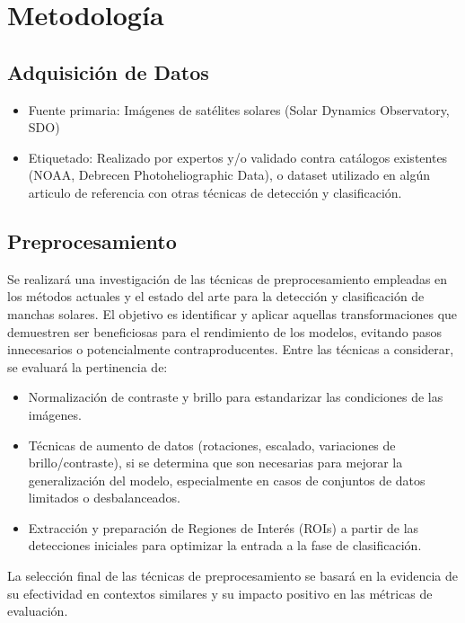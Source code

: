 \documentclass[conference]{IEEEtran}
\begin{document}
\section*{Metodología}

\subsection*{Adquisición de Datos}
\begin{itemize}
    \item Fuente primaria: Imágenes de satélites solares (Solar Dynamics Observatory, SDO)
    \item Etiquetado: Realizado por expertos y/o validado contra catálogos existentes (NOAA, Debrecen Photoheliographic Data), o dataset utilizado en algún articulo de referencia con otras técnicas de detección y clasificación.
\end{itemize}


\subsection*{Preprocesamiento}
Se realizará una investigación de las técnicas de preprocesamiento empleadas en los métodos actuales y el estado del arte para la detección y clasificación de manchas solares. El objetivo es identificar y aplicar aquellas transformaciones que demuestren ser beneficiosas para el rendimiento de los modelos, evitando pasos innecesarios o potencialmente contraproducentes. Entre las técnicas a considerar, se evaluará la pertinencia de:
\begin{itemize}
    \item Normalización de contraste y brillo para estandarizar las condiciones de las imágenes.
    \item Técnicas de aumento de datos (rotaciones, escalado, variaciones de brillo/contraste), si se determina que son necesarias para mejorar la generalización del modelo, especialmente en casos de conjuntos de datos limitados o desbalanceados.
    \item Extracción y preparación de Regiones de Interés (ROIs) a partir de las detecciones iniciales para optimizar la entrada a la fase de clasificación.
\end{itemize}
La selección final de las técnicas de preprocesamiento se basará en la evidencia de su efectividad en contextos similares y su impacto positivo en las métricas de evaluación.
\end{document}
